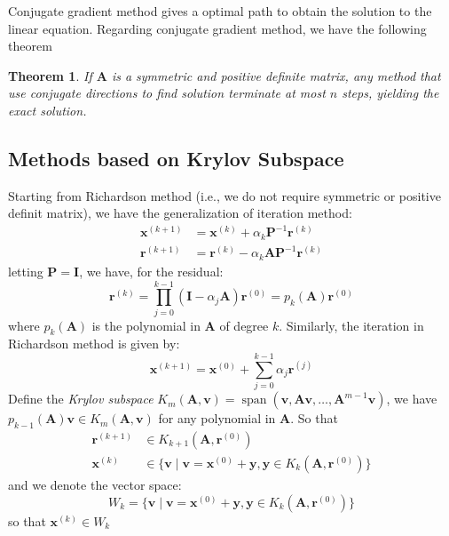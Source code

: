 \documentclass{article}
\DeclareMathOperator{\spn}{span}
\newtheorem*{theorem}{Theorem}
\begin{document}
Conjugate gradient method gives a optimal path to obtain the solution to the linear equation.
Regarding conjugate gradient method, we have the following theorem 
\begin{theorem}
If $\mathbf{A}$ is a symmetric and positive definite matrix, any method that use 
conjugate directions to find solution terminate at most $n$ steps, yielding the exact solution.    
\end{theorem}

\subsection{Methods based on Krylov Subspace}
Starting from Richardson method (i.e., we do not require symmetric or positive definit matrix), 
we have the generalization of iteration method:
\begin{align*}
    \mathbf{x}^{(k+1)} &= \mathbf{x}^{(k)} + \alpha_k \mathbf{P}^{-1}\mathbf{r}^{(k)} \\
    \mathbf{r}^{(k+1)} &= \mathbf{r}^{(k)} - \alpha_k \mathbf{A} \mathbf{P}^{-1}\mathbf{r}^{(k)}
\end{align*}
letting $\mathbf{P} = \mathbf{I}$, we have, for the residual:
\begin{equation}
    \mathbf{r}^{(k)} = \prod_{j=0}^{k-1} \left(\mathbf{I} - \alpha_j \mathbf{A}\right) \mathbf{r}^{(0)} 
    = p_k(\mathbf{A}) \mathbf{r}^{(0)}
\end{equation}
where $p_k(\mathbf{A})$ is the polynomial in $\mathbf{A}$ of degree $k$. Similarly, the iteration 
in Richardson method is given by:
\begin{equation}
    \mathbf{x}^{(k+1)} = \mathbf{x}^{(0)} + \sum_{j=0}^{k-1} \alpha_j \mathbf{r}^{(j)}
\end{equation}
Define the \emph{Krylov subspace}
$K_m(\mathbf{A},\mathbf{v}) = \spn( \mathbf{v}, \mathbf{A}\mathbf{v}, \dots, \mathbf{A}^{m-1}\mathbf{v} )$,
we have $p_{k-1}(\mathbf{A}) \mathbf{v} \in K_m(\mathbf{A},\mathbf{v})$ for any polynomial in $\mathbf{A}$.
So that 
\begin{align*}
    \mathbf{r}^{(k+1)} &\in K_{k+1}(\mathbf{A},\mathbf{r}^{(0)}) \\
    \mathbf{x}^{(k)} &\in \{\mathbf{v}\mid \mathbf{v} = \mathbf{x}^{(0)} + \mathbf{y}, \mathbf{y} \in K_{k}(\mathbf{A},\mathbf{r}^{(0)})\}
\end{align*}
and we denote the vector space:
\begin{equation*}
    W_k = \{\mathbf{v}\mid \mathbf{v} = \mathbf{x}^{(0)} + \mathbf{y}, \mathbf{y} \in K_{k}(\mathbf{A},\mathbf{r}^{(0)})\}
\end{equation*}
so that $\mathbf{x}^{(k)} \in W_k$
\end{document}
